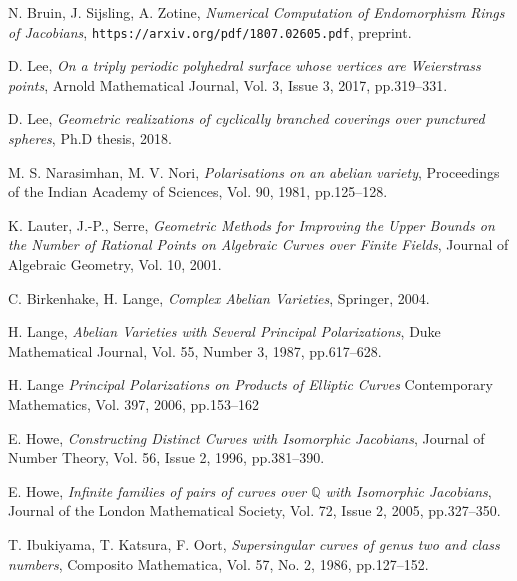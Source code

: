 \documentclass[12pt,reqno]{amsart}
\newcommand{\Q}{\mathbb{Q}}
\theoremstyle{definition}
\theoremstyle{remark}
\begin{document}
\begin{thebibliography}{20}

N. Bruin, J. Sijsling, A. Zotine,
\textit{Numerical Computation of Endomorphism Rings of Jacobians},
\texttt{https://arxiv.org/pdf/1807.02605.pdf}, preprint.

D. Lee,
\textit{On a triply periodic polyhedral surface whose vertices are Weierstrass points},
Arnold Mathematical Journal, 
Vol. 3, Issue 3, 2017, pp.319--331.

D. Lee, 
\textit{Geometric realizations of cyclically branched coverings over punctured spheres}, 
Ph.D thesis, 2018.


M. S. Narasimhan, M. V. Nori,
\textit{Polarisations on an abelian variety},
Proceedings of the Indian Academy of Sciences,
Vol. 90, 1981, pp.125--128.

K. Lauter, J.-P., Serre, 
\textit{Geometric Methods for Improving the Upper Bounds on the Number of Rational Points on Algebraic Curves over Finite Fields}, 
Journal of Algebraic Geometry,
Vol. 10, 2001.

C. Birkenhake, H. Lange, 
\textit{Complex Abelian Varieties},
Springer, 2004.



H. Lange,
\textit{Abelian Varieties with Several Principal Polarizations},
Duke Mathematical Journal,
Vol. 55, Number 3, 1987, pp.617--628.

H. Lange
\textit{Principal Polarizations on Products of Elliptic Curves}
Contemporary Mathematics, Vol. 397, 2006, pp.153--162

E. Howe,
\textit{Constructing Distinct Curves with Isomorphic Jacobians},
Journal of Number Theory,
Vol. 56, Issue 2, 1996, pp.381--390.

E. Howe,
\textit{Infinite families of pairs of curves over $\Q$ with Isomorphic Jacobians},
Journal of the London Mathematical Society,
Vol. 72, Issue 2, 2005, pp.327--350.

T. Ibukiyama, T. Katsura, F. Oort,
\textit{Supersingular curves of genus two and class numbers},
Composito Mathematica,
Vol. 57, No. 2, 1986, pp.127--152.

\end{thebibliography}
\end{document}
